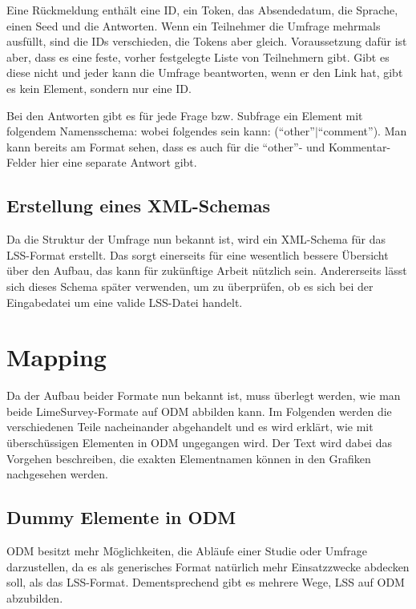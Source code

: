Eine Rückmeldung enthält eine ID, ein Token, das Absendedatum, die Sprache, einen Seed und die Antworten.
Wenn ein Teilnehmer die Umfrage mehrmals ausfüllt, sind die IDs verschieden, die Tokens aber gleich.
Voraussetzung dafür ist aber, dass es eine feste, vorher festgelegte Liste von Teilnehmern gibt.
Gibt es diese nicht und jeder kann die Umfrage beantworten, wenn er den Link hat, gibt es kein  Element, sondern nur eine ID.

Bei den Antworten gibt es für jede Frage bzw. Subfrage ein Element mit folgendem Namensschema: 
\noindent wobei  folgendes sein kann: (\enquote{other}$\vert$\enquote{comment}).
Man kann bereits am Format sehen, dass es auch für die \enquote{other}- und Kommentar-Felder hier eine separate Antwort gibt.

\subsection{Erstellung eines XML-Schemas}
\label{an:xsd}
Da die Struktur der Umfrage nun bekannt ist, wird ein XML-Schema für das LSS-Format erstellt.
Das sorgt einerseits für eine wesentlich bessere Übersicht über den Aufbau, das kann für zukünftige Arbeit nützlich sein.
Andererseits lässt sich dieses Schema später verwenden, um zu überprüfen, ob es sich bei der Eingabedatei um eine valide LSS-Datei handelt.

\section{Mapping}

Da der Aufbau beider Formate nun bekannt ist, muss überlegt werden, wie man beide LimeSurvey-Formate auf ODM abbilden kann. Im Folgenden werden die verschiedenen Teile nacheinander abgehandelt und es wird erklärt, wie mit überschüssigen Elementen in ODM ungegangen wird.
Der Text wird dabei das Vorgehen beschreiben, die exakten Elementnamen können in den Grafiken nachgesehen werden.

\subsection{Dummy Elemente in ODM}

ODM besitzt mehr Möglichkeiten, die Abläufe einer Studie oder Umfrage darzustellen, da es als generisches Format natürlich mehr Einsatzzwecke abdecken soll, als das LSS-Format.
Dementsprechend gibt es mehrere Wege, LSS auf ODM abzubilden.

